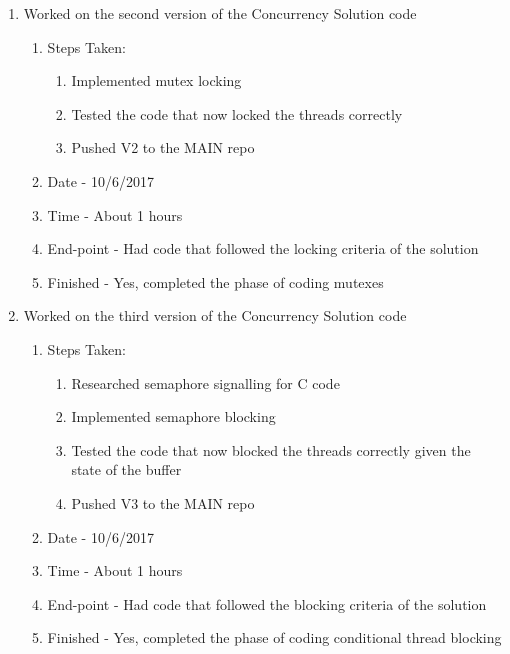 \documentclass[letterpaper,10pt,fleqn]{article}
\begin{document}
\begin{enumerate}
	\item Worked on the second version of the Concurrency Solution code
		\begin{enumerate}
			\item Steps Taken:
				\begin{enumerate}
					\item Implemented mutex locking
					\item Tested the code that now locked the threads correctly
					\item Pushed V2 to the MAIN repo
				\end{enumerate}
			\item Date - 10/6/2017
			\item Time - About 1 hours
			\item End-point - Had code that followed the locking criteria of the solution
			\item Finished - Yes, completed the phase of coding mutexes
		\end {enumerate}
		
	\item Worked on the third version of the Concurrency Solution code
		\begin{enumerate}
			\item Steps Taken:
				\begin{enumerate}
					\item Researched semaphore signalling for C code
					\item Implemented semaphore blocking
					\item Tested the code that now blocked the threads correctly given the state of the buffer
					\item Pushed V3 to the MAIN repo
				\end{enumerate}
			\item Date - 10/6/2017
			\item Time - About 1 hours
			\item End-point - Had code that followed the blocking criteria of the solution
			\item Finished - Yes, completed the phase of coding conditional thread blocking
		\end {enumerate}
		

\end{enumerate}
\end{document}
